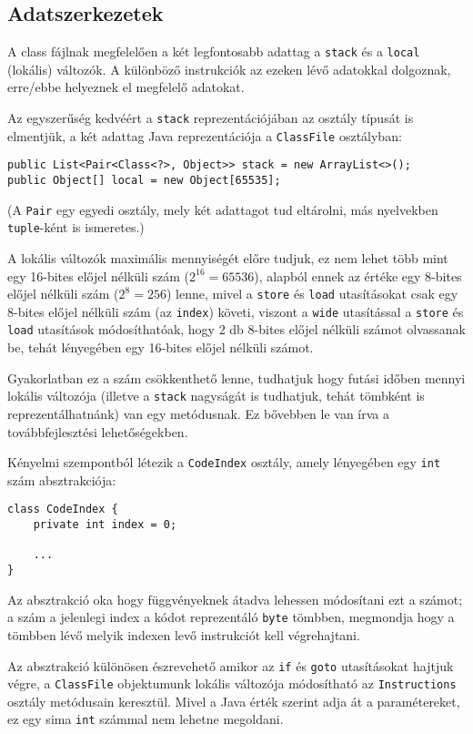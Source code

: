 \subsection{Adatszerkezetek}

A class fájlnak megfelelően a két legfontosabb adattag a \lstinline{stack} és a \lstinline{local} (lokális) változók. A különböző instrukciók az ezeken lévő adatokkal dolgoznak, erre/ebbe helyeznek el megfelelő adatokat.

Az egyszerűség kedvéért a \lstinline{stack} reprezentációjában az osztály típusát is elmentjük, a két adattag Java reprezentációja a \lstinline{ClassFile} osztályban:
\begin{verbatim}
public List<Pair<Class<?>, Object>> stack = new ArrayList<>();
public Object[] local = new Object[65535];
\end{verbatim}
(A \lstinline{Pair} egy egyedi osztály, mely két adattagot tud eltárolni, más nyelvekben \lstinline{tuple}-ként is ismeretes.)

A lokális változók maximális mennyiségét előre tudjuk, ez nem lehet több mint egy 16-bites előjel nélküli szám ($2^{16} = 65536$), alapból ennek az értéke egy 8-bites előjel nélküli szám ($2^8 = 256$) lenne, mivel a \lstinline{store} és \lstinline{load} utasításokat csak egy 8-bites előjel nélküli szám (az \lstinline{index}) követi, viszont a \lstinline{wide} utasítással a \lstinline{store} és \lstinline{load} utasítások módosíthatóak, hogy 2 db 8-bites előjel nélküli számot olvassanak be, tehát lényegében egy 16-bites előjel nélküli számot.

Gyakorlatban ez a szám csökkenthető lenne, tudhatjuk hogy futási időben mennyi lokális változója (illetve a \lstinline{stack} nagyságát is tudhatjuk, tehát tömbként is reprezentálhatnánk) van egy metódusnak. Ez bővebben le van írva a továbbfejlesztési lehetőségekben.

Kényelmi szempontból létezik a \lstinline{CodeIndex} osztály, amely lényegében egy \lstinline{int} szám absztrakciója:
\begin{verbatim}
class CodeIndex {
    private int index = 0;

    ...
}
\end{verbatim}
Az absztrakció oka hogy függvényeknek átadva lehessen módosítani ezt a számot; a szám a jelenlegi index a kódot reprezentáló \lstinline{byte} tömbben, megmondja hogy a tömbben lévő melyik indexen levő instrukciót kell végrehajtani.

Az absztrakció különösen észrevehető amikor az \lstinline{if} és \lstinline{goto} utasításokat hajtjuk végre, a \lstinline{ClassFile} objektumunk lokális változója módosítható az \lstinline{Instructions} osztály metódusain keresztül. Mivel a Java érték szerint adja át a paramétereket, ez egy sima \lstinline{int} számmal nem lehetne megoldani.

